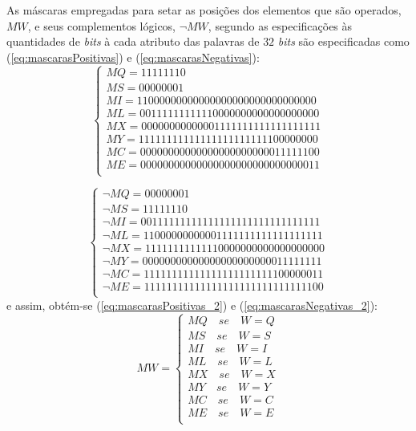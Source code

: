 As máscaras empregadas para setar as posições dos elementos que são operados, $MW$, e seus complementos lógicos, $\neg MW$, segundo as especificações às quantidades de \textit{bits} à cada atributo das palavras de $32$ \textit{bits} são especificadas como (\ref{eq:mascarasPositivas}) e (\ref{eq:mascarasNegativas}):
\begin{equation}
 \begin{cases}
 MQ  = 11111110 \\
 MS  = 00000001 \\
 
 MI  = 11000000000000000000000000000000  \\
 ML  = 00111111111110000000000000000000  \\
 MX  = 00000000000001111111111111111111  \\
 
 MY  = 11111111111111111111111100000000  \\
 MC  = 00000000000000000000000011111100  \\
 ME  = 00000000000000000000000000000011  \\
 \end{cases}
 \label{eq:mascarasPositivas}
\end{equation}

\begin{equation}
 \begin{cases}
 \neg MQ  = 00000001 \\
 \neg MS  = 11111110 \\
 
 \neg MI  = 00111111111111111111111111111111  \\
 \neg ML  = 11000000000001111111111111111111  \\
 \neg MX  = 11111111111110000000000000000000  \\
 
 \neg MY  = 00000000000000000000000011111111  \\
 \neg MC  = 11111111111111111111111100000011  \\
 \neg ME  = 11111111111111111111111111111100  \\
 \end{cases}
 \label{eq:mascarasNegativas}
\end{equation}
e assim, obtém-se (\ref{eq:mascarasPositivas_2}) e (\ref{eq:mascarasNegativas_2}):
\begin{equation}
 MW= 
 \begin{cases}
 MQ \quad se \quad W=Q   \\
 MS \quad se \quad W=S  \\
 
 MI \quad se \quad W=I  \\
 ML \quad se \quad W=L  \\ 
 MX \quad se \quad W=X  \\
 
 MY \quad se \quad W=Y   \\
 MC \quad se \quad W=C   \\
 ME \quad se \quad W=E  \\
 \end{cases}
 \label{eq:mascarasPositivas_2}
\end{equation}

